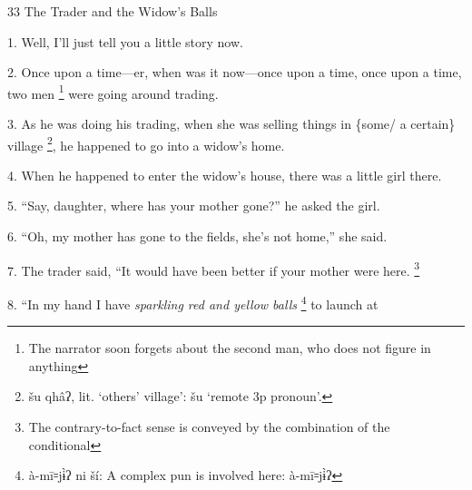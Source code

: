 
33 The Trader and the Widow's Balls

1. Well, I'll just tell you a little story now.

2. Once upon a time---er, when was it now---once upon a time, once upon a time,
two men \footnote{The narrator soon forgets about the second man, who does not figure in anything} were going around trading.

3. As he was doing his trading, when she was selling things in \{some/ a certain\}
village \footnote{šu qhâʔ, lit. `others' village': šu `remote 3p pronoun'.}, he happened to go into a widow's home.

4. When he happened to enter the widow's house, there was a little girl there.

5. ``Say, daughter, where has your mother gone?'' he asked the girl.

6. ``Oh, my mother has gone to the fields, she's not home,'' she said.

7. The trader said, ``It would have been better if your mother were here. \footnote{The contrary-to-fact sense is conveyed by the combination of the conditional}

8. ``In my hand I have \textit{sparkling red and yellow balls} \footnote{à-mī꞊jɨ̀ʔ ni ší: A complex pun is involved here: à-mī꞊jɨ̀ʔ} to launch at
